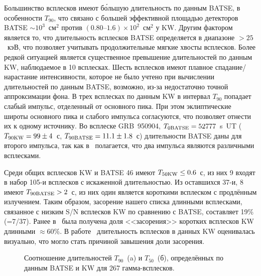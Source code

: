 Большинство всплесков имеют б\'{о}льшую длительность по данным BATSE, 
в особенности $T_{90}$, что связано с большей  эффективной площадью детекторов 
BATSE $\sim 10^3$~см$^2$ против $(0.80\textrm{--}1.6)\times 10^2$~см$^2$ у KW. 
Другим фактором является то, что длительность всплесков BATSE определяется в 
диапазоне $>25$~кэВ, что позволяет учитывать продолжительные мягкие хвосты всплесков. 
Более редкой ситуацией является существенное превышение длительностей по данным KW, 
наблюдаемое в 10 всплесках. Шесть всплесков имеют плавное спадание/нарастание интенсивности, 
которое не было учтено при вычислении  длительностей по данным BATSE, возможно, 
из-за недостаточно точной аппроксимации фона. В трех всплесках по данным KW
в интервал $T_{90}$ попадает слабый импульс, отделенный от основного пика. 
При этом эклиптические широты основного пика и слабого импульса согласуются, 
что позволяет отнести их к одному источнику. Во всплеске GRB~950904, 
$T_{0{\mathrm{BATSE}}} = 52777$~s~UT ($T_{90{\mathrm{KW}}} = 99 \pm 4$~с, $T_{90{\mathrm{BATSE}}} = 11.1\pm 1.8$~с) 
длительности BATSE даны для второго импульса, так как в~\citep{Hurley_2005} полагается, 
что два импульса являются различными всплесками.

Среди общих всплесков KW и BATSE 46 имеют $T_{50{\mathrm{KW}}} \leq 0.6$~с, 
из них 9 входят в набор 105-и всплесков с искаженной длительностью. 
Из оставшихся 37-и, 8 имеют $T_{90{\mathrm{BATSE}}} > 2$~с, 
из них один является короткими всплеском с продлённым излучением. Таким образом, 
засорение нашего списка длинными всплесками, связанное с низким S/N всплесков KW
по сравнению с BATSE, составляет 19\% (=7/37). %
Ранее в~\citep{Ofek_2007ApJ} была получена доля 
<<засорения>> коротких всплесков KW длинными $\approx 60$\%. В работе~\citep{Ofek_2007ApJ} 
длительность всплесков в данных KW оценивалась визуально, что могло 
стать причиной завышения доли засорения. 

\begin{figure}[h]
  \begin{minipage}[h]{0.5\textwidth}
  \end{minipage}
  \hfill
  \begin{minipage}[h]{0.5\textwidth}
  \end{minipage}
  \caption{Соотношение длительностей $T_{90}$~(a) и $T_{50}$~(б), определённых по 
  данным BATSE и KW для 267 гамма-всплесков.}
  \label{img:T90andT50_KWvsBATSE}  
\end{figure}

